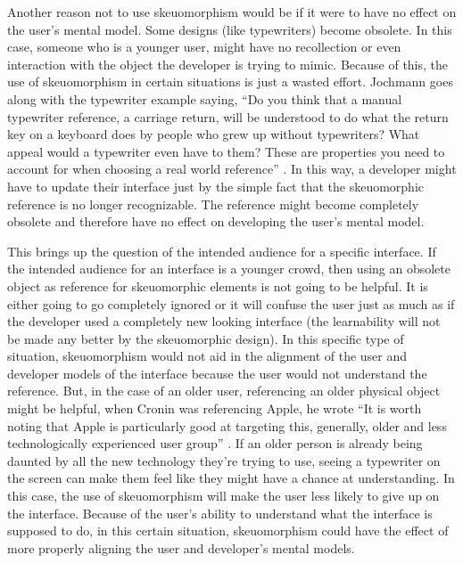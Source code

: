 \documentclass{article}
\begin{document}
Another reason not to use skeuomorphism would be if it were to have no effect on the user's mental model. Some designs (like typewriters) become obsolete. In this case, someone who is a younger user, might have no recollection or even interaction with the object the developer is trying to mimic. Because of this, the use of skeuomorphism in certain situations is just a wasted effort. Jochmann goes along with the typewriter example saying, ``Do you think that a manual typewriter reference, a carriage return, will be understood to do what the return key on a keyboard does by people who grew up without typewriters? What appeal would a typewriter even have to them? These are properties you need to account for when choosing a real world reference'' \cite{jochmann}. In this way, a developer might have to update their interface just by the simple fact that the skeuomorphic reference is no longer recognizable. The reference might become completely obsolete and therefore have no effect on developing the user's mental model.

This brings up the question of the intended audience for a specific interface. If the intended audience for an interface is a younger crowd, then using an obsolete object as reference for skeuomorphic elements is not going to be helpful. It is either going to go completely ignored or it will confuse the user just as much as if the developer used a completely new looking interface (the learnability will not be made any better by the skeuomorphic design). In this specific type of situation, skeuomorphism would not aid in the alignment of the user and developer models of the interface because the user would not understand the reference. But, in the case of an older user, referencing an older physical object might be helpful, when Cronin was referencing Apple, he wrote ``It is worth noting that Apple is particularly good at targeting this, generally, older and less technologically experienced user group'' \cite{tutsplus}. If an older person is already being daunted by all the new technology they’re trying to use, seeing a typewriter on the screen can make them feel like they might have a chance at understanding. In this case, the use of skeuomorphism will make the user less likely to give up on the interface. Because of the user's ability to understand what the interface is supposed to do, in this certain situation, skeuomorphism could have the effect of more properly aligning the user and developer's mental models.
\end{document}
